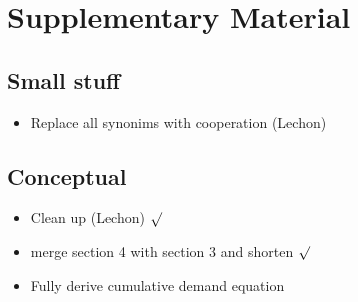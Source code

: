 \documentclass{article}
\begin{document}
    \section{Supplementary Material}
    \subsection{Small stuff}
    \begin{itemize}
        \item Replace all synonims with cooperation (Lechon)
    \end{itemize}
    \subsection{Conceptual}
    \begin{itemize}
        \item Clean up (Lechon) $\surd$
        \item merge section 4 with section 3 and shorten $\surd$
        \item Fully derive cumulative demand equation
    \end{itemize}
    
    
\end{document}
